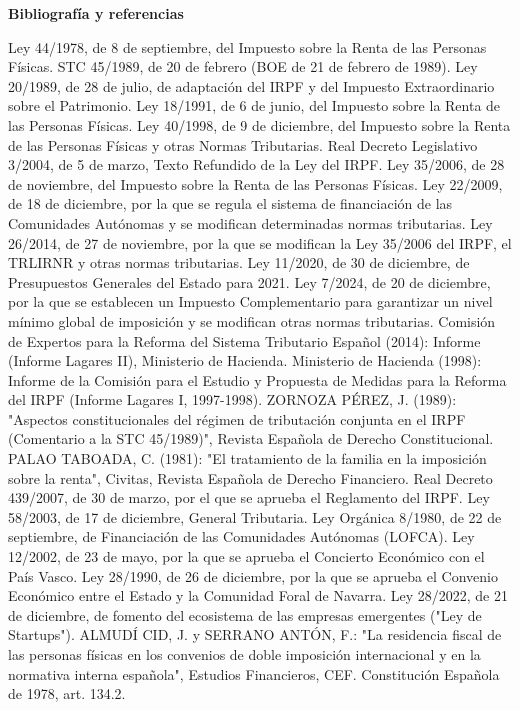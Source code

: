 \documentclass[10pt,a4paper]{article}
\newcounter{myref}
\newcommand{\MyBibliography}{%
  \clearpage
  \phantomsection
  {\centering\bfseries\Large Bibliografía y referencias\par}%
  \medskip
  \addcontentsline{stc}{section}{Bibliografía y referencias}%
  \setcounter{myref}{0}%
}
\begin{document}
\clearpage
{}
\MyBibliography


Ley 44/1978, de 8 de septiembre, del Impuesto sobre la Renta de las Personas Físicas.
STC 45/1989, de 20 de febrero (BOE de 21 de febrero de 1989).
Ley 20/1989, de 28 de julio, de adaptación del IRPF y del Impuesto Extraordinario sobre el Patrimonio.
Ley 18/1991, de 6 de junio, del Impuesto sobre la Renta de las Personas Físicas.
Ley 40/1998, de 9 de diciembre, del Impuesto sobre la Renta de las Personas Físicas y otras Normas Tributarias.
Real Decreto Legislativo 3/2004, de 5 de marzo, Texto Refundido de la Ley del IRPF.
Ley 35/2006, de 28 de noviembre, del Impuesto sobre la Renta de las Personas Físicas.
Ley 22/2009, de 18 de diciembre, por la que se regula el sistema de financiación de las Comunidades Autónomas y se modifican determinadas normas tributarias.
Ley 26/2014, de 27 de noviembre, por la que se modifican la Ley 35/2006 del IRPF, el TRLIRNR y otras normas tributarias.
Ley 11/2020, de 30 de diciembre, de Presupuestos Generales del Estado para 2021.
Ley 7/2024, de 20 de diciembre, por la que se establecen un Impuesto Complementario para garantizar un nivel mínimo global de imposición y se modifican otras normas tributarias.
Comisión de Expertos para la Reforma del Sistema Tributario Español (2014): Informe (Informe Lagares II), Ministerio de Hacienda.
Ministerio de Hacienda (1998): Informe de la Comisión para el Estudio y Propuesta de Medidas para la Reforma del IRPF (Informe Lagares I, 1997-1998).
ZORNOZA PÉREZ, J. (1989): "Aspectos constitucionales del régimen de tributación conjunta en el IRPF (Comentario a la STC 45/1989)", Revista Española de Derecho Constitucional.
PALAO TABOADA, C. (1981): "El tratamiento de la familia en la imposición sobre la renta", Civitas, Revista Española de Derecho Financiero.
Real Decreto 439/2007, de 30 de marzo, por el que se aprueba el Reglamento del IRPF.
Ley 58/2003, de 17 de diciembre, General Tributaria.
Ley Orgánica 8/1980, de 22 de septiembre, de Financiación de las Comunidades Autónomas (LOFCA).
Ley 12/2002, de 23 de mayo, por la que se aprueba el Concierto Económico con el País Vasco.
Ley 28/1990, de 26 de diciembre, por la que se aprueba el Convenio Económico entre el Estado y la Comunidad Foral de Navarra.
Ley 28/2022, de 21 de diciembre, de fomento del ecosistema de las empresas emergentes ("Ley de Startups").
ALMUDÍ CID, J. y SERRANO ANTÓN, F.: "La residencia fiscal de las personas físicas en los convenios de doble imposición internacional y en la normativa interna española", Estudios Financieros, CEF.
Constitución Española de 1978, art. 134.2.
\end{document}
